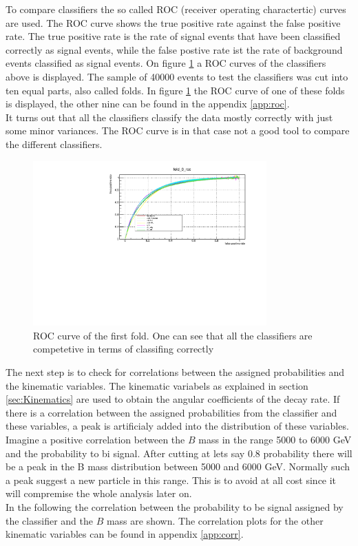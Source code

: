 \documentclass[english]{uzhpub}
\begin{document}
To compare classifiers the so called ROC (receiver operating charactertic) curves are used. The ROC curve shows the true positive rate against the false positive rate. The true positive rate is the rate of signal events that have been classified correctly as signal events, while the false postive rate ist the rate of background events classified as signal events. On figure \ref{fig:roc} a ROC curves of the classifiers above is displayed.
The sample of 40000 events to test the classifiers was cut into ten equal parts, also called folds. In figure \ref{fig:roc} the ROC curve of one of these folds is displayed, the other nine can be found in the appendix \ref{app:roc}. \\
 It turns out that all the classifiers classify the data mostly correctly with just some minor variances. The ROC curve is in that case not a good tool to compare the different classifiers.
 \begin{figure}[H]
  \centering
  \includegraphics[width=0.8\textwidth]{roc/fold_0_roc.pdf}
  \caption{ROC curve of the first fold. One can see that all the classifiers are competetive in terms of classifing correctly}
  \label{fig:roc}
 \end{figure}
 The next step is to check for correlations between the assigned probabilities and the kinematic variables. The kinematic variabels as explained in section \ref{sec:Kinematics} are used to obtain the angular coefficients of the decay rate. If there is a correlation between the assigned probabilities from the classifier and these variables, a peak is artificialy added into the distribution of these variables. Imagine a positive correlation between the $B$ mass in the range 5000 to 6000 GeV and the probability to bi signal. After cutting at lets say 0.8 probability there will be a peak in the B mass distribution between 5000 and 6000 GeV. Normally such a peak suggest a new particle in this range. This is to avoid at all cost since it will compremise the whole analysis later on. \\
In the following the correlation between the probability to be signal assigned by the classifier and the $B$ mass are shown. The correlation plots for the other kinematic variables can be found in appendix \ref{app:corr}.
\end{document}
